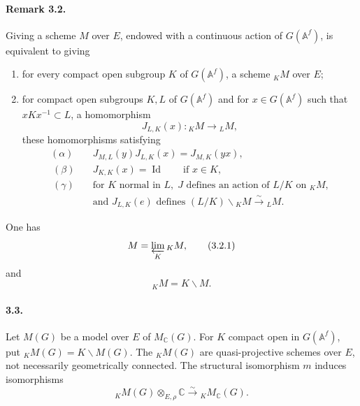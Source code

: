 \documentclass[10pt]{article}
\newcommand{\Af}{\mathbb A^f}
\newcommand{\C}{\mathbb C}
\newcommand{\id}{\operatorname{Id}}
\newcommand{\limproj}{\varprojlim}
\newcommand{\MC}{M_{\C}}
\begin{document}
\paragraph{Remark 3.2.} Giving a scheme $M$ over $E$, endowed with a continuous action of $G(\Af)$, is equivalent to giving
\begin{enumerate}[label=(\alph*),leftmargin=2.4em]
\item for every compact open subgroup $K$ of $G(\Af)$, a scheme ${}_K M$ over $E$;
\item for compact open subgroups $K,L$ of $G(\Af)$ and for $x\in G(\Af)$ such that $xKx^{-1}\subset L$, a homomorphism
\[
J_{L,K}(x):{}_K M\longrightarrow {}_L M,
\]
these homomorphisms satisfying
\begin{align*}
(\alpha)\quad&J_{M,L}(y)J_{L,K}(x)=J_{M,K}(yx),\tag{3.2$\alpha$}\\\
(\beta)\quad&J_{K,K}(x)=\id\qquad\text{if }x\in K,\tag{3.2$\beta$}\\\
(\gamma)\quad&\text{for }K\text{ normal in }L,\; J\text{ defines an action of }L/K\text{ on }{}_K M,\\
&\text{and }J_{L,K}(e)\text{ defines }(L/K)\backslash {}_K M\xrightarrow{\sim}{}_L M.\tag{3.2$\gamma$}
\end{align*}
\end{enumerate}
One has
\[
M=\limproj_K {}_K M,\tag{3.2.1}
\]
and
\[
{}_K M=K\backslash M.\tag{3.2.2}
\]

\paragraph{3.3.} Let $M(G)$ be a model over $E$ of $\MC(G)$. For $K$ compact open in $G(\Af)$, put ${}_K M(G)=K\backslash M(G)$. The ${}_K M(G)$ are quasi-projective schemes over $E$, not necessarily geometrically connected. The structural isomorphism $m$ induces isomorphisms
\[
{}_K M(G)\otimes_{E,\rho}\C\xrightarrow{\sim}{}_K\MC(G).\tag{3.3.1}
\]
\end{document}
